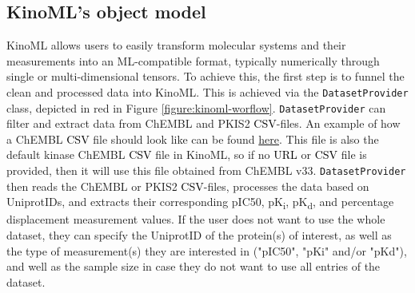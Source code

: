 \documentclass[9pt,lessons]{livecoms}
\newcommand{\revision}[1]{\textcolor{black}{#1}}
\begin{document}
\subsection{KinoML's object model}



KinoML allows users to easily transform molecular systems and their measurements into an ML-compatible format, typically numerically through single or multi-dimensional tensors. To achieve this, the first step is to funnel the clean and processed data into KinoML. This is achieved via the \texttt{DatasetProvider} class, depicted in red in Figure \ref{figure:kinoml-worflow}. \texttt{DatasetProvider} can filter and extract data from ChEMBL and PKIS2 \revision{CSV}-files. An example of how a ChEMBL \revision{CSV} file should look like can be found \href{https://github.com/openkinome/kinodata/blob/master/data/human_kinases_and_chembl_targets.chembl_33.csv}{here}. This file is also the default kinase ChEMBL \revision{CSV} file in KinoML, so if no \revision{URL} or \revision{CSV} file is provided, then it will use this file obtained from ChEMBL v33. \texttt{DatasetProvider} then reads the ChEMBL or PKIS2 \revision{CSV}-files, processes the data based on UniprotIDs, and extracts their corresponding pIC50, pK\textsubscript{i}, pK\textsubscript{d}, and percentage displacement measurement values. If the user does not want to use the whole dataset, they can specify the UniprotID of the protein(s) of interest, as well as the type of measurement(s) they are interested in ("pIC50", "pKi" and/or "pKd"), and well as the sample size in case they do not want to use all entries of the dataset. 
\end{document}
